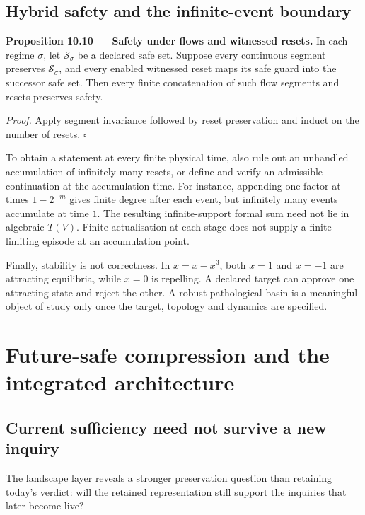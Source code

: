 \documentclass[11pt,a4paper]{article}
\begin{document}
\subsection{Hybrid safety and the infinite-event
boundary}\label{hybrid-safety-and-the-infinite-event-boundary}


\textbf{Proposition 10.10 --- Safety under flows and witnessed resets.}
In each regime \(\sigma\), let \(\mathscr S_\sigma\) be a declared safe
set. Suppose every continuous segment preserves \(\mathscr S_\sigma\),
and every enabled witnessed reset maps its safe guard into the successor
safe set. Then every finite concatenation of such flow segments and
resets preserves safety.

\emph{Proof.} Apply segment invariance followed by reset preservation
and induct on the number of resets. \(\square\)

To obtain a statement at every finite physical time, also rule out an
unhandled accumulation of infinitely many resets, or define and verify
an admissible continuation at the accumulation time. For instance,
appending one factor at times \(1-2^{-m}\) gives finite degree after
each event, but infinitely many events accumulate at time \(1\). The
resulting infinite-support formal sum need not lie in algebraic
\(T(V)\). Finite actualisation at each stage does not supply a finite
limiting episode at an accumulation point.

Finally, stability is not correctness. In \(\dot x=x-x^3\), both \(x=1\)
and \(x=-1\) are attracting equilibria, while \(x=0\) is repelling. A
declared target can approve one attracting state and reject the other. A
robust pathological basin is a meaningful object of study only once the
target, topology and dynamics are specified.

\section{Future-safe compression and the integrated
architecture}\label{future-safe-compression-and-the-integrated-architecture}

\subsection{Current sufficiency need not survive a new
inquiry}\label{current-sufficiency-need-not-survive-a-new-inquiry}

The landscape layer reveals a stronger preservation question than
retaining today's verdict: will the retained representation still
support the inquiries that later become live?
\end{document}
